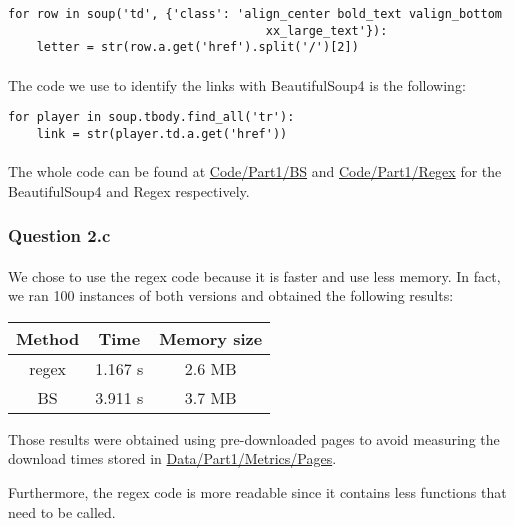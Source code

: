\begin{verbatim}
for row in soup('td', {'class': 'align_center bold_text valign_bottom
                                    xx_large_text'}):
	letter = str(row.a.get('href').split('/')[2])
\end{verbatim}

\paragraph{}The code we use to identify the links with BeautifulSoup4 is the following:

\begin{verbatim}
for player in soup.tbody.find_all('tr'):
	link = str(player.td.a.get('href'))
\end{verbatim}

\paragraph{}The whole code can be found at \url{Code/Part1/BS} and \url{Code/Part1/Regex} for the BeautifulSoup4 and Regex respectively.

\subsubsection{Question 2.c}
\label{subsubsec:312c}
\paragraph{} We chose to use the regex code because it is faster and use less memory. In fact, we ran 100 instances of both versions and obtained the following results:
\begin{center}
	\begin{tabular}{| c | c | c |}
	\hline
	Method & Time & Memory size \\ \hline
	regex 	& 1.167 s & 2.6 MB \\ \hline
	BS & 3.911 s & 3.7 MB \\
	\hline
	\end{tabular}
\end{center}

Those results were obtained using pre-downloaded pages to avoid measuring the download times stored in \url{Data/Part1/Metrics/Pages}.

Furthermore, the regex code is more readable since it contains less functions that need to be called.

